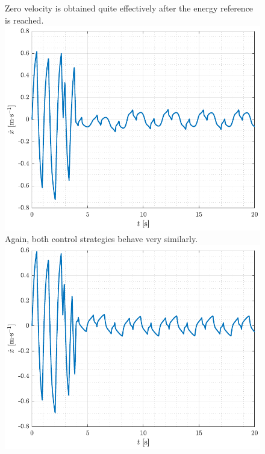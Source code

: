\begin{figure}[H]
  \hspace{-10pt}
  \captionbox
  {
    Zero velocity is obtained quite effectively after the energy reference is reached.
    \label{fig:xDot_3_conX}
  }
  {
    \hspace{-1cm}
    \includegraphics[width=.4\textwidth]{figures/xDot_3_conX}
  }
  \hspace{20pt}
  \captionbox 
  {
    Again, both control strategies behave very similarly.
    \label{fig:xDot_4_conX}
  }
  {
    \hspace{-1cm}
    \includegraphics[width=.4\textwidth]{figures/xDot_4_conX}
  }  
\end{figure}

